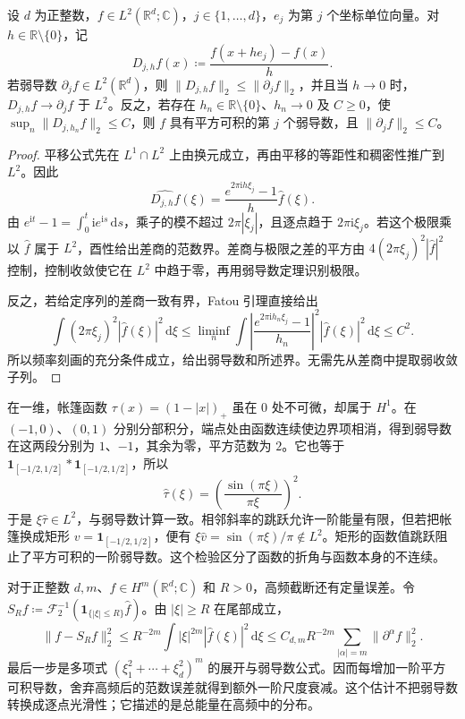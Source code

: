 \begin{proposition}[平方范数差商]\label{b2:prop:04-difference-quotients}
设 \(d\) 为正整数，\(f\in L^2(\mathbb R^d;\mathbb C)\)，\(j\in\{1,\ldots,d\}\)，\(e_j\) 为第 \(j\) 个坐标单位向量。对 \(h\in\mathbb R\setminus\{0\}\)，记
\[
 D_{j,h}f(x)\coloneqq\frac{f(x+he_j)-f(x)}h.
\]
若弱导数 \(\partial_jf\in L^2(\mathbb R^d)\)，则 \(\|D_{j,h}f\|_2\leq\|\partial_jf\|_2\)，并且当 \(h\to0\) 时，\(D_{j,h}f\to\partial_jf\) 于 \(L^2\)。反之，若存在 \(h_n\in\mathbb R\setminus\{0\}\)、\(h_n\to0\) 及 \(C\geq0\)，使 \(\sup_n\|D_{j,h_n}f\|_2\leq C\)，则 \(f\) 具有平方可积的第 \(j\) 个弱导数，且 \(\|\partial_jf\|_2\leq C\)。
\end{proposition}
\begin{proof}
平移公式先在 \(L^1\cap L^2\) 上由换元成立，再由平移的等距性和稠密性推广到 \(L^2\)。因此
\[
 \widehat {D_{j,h}f}(\xi)
 =\frac{e^{2\pi\mathrm{i}h\xi_j}-1}{h}\widehat f(\xi).
\]
由 \(e^{\mathrm{i}t}-1=\int_0^t\mathrm{i}e^{\mathrm{i}s}\,\mathrm{d}s\)，乘子的模不超过 \(2\pi|\xi_j|\)，且逐点趋于 \(2\pi\mathrm{i}\xi_j\)。若这个极限乘以 \(\widehat f\) 属于 \(L^2\)，酉性给出差商的范数界。差商与极限之差的平方由 \(4(2\pi\xi_j)^2|\widehat f|^2\) 控制，控制收敛使它在 \(L^2\) 中趋于零，再用弱导数定理识别极限。

反之，若给定序列的差商一致有界，Fatou 引理直接给出
\[
 \int(2\pi\xi_j)^2|\widehat f(\xi)|^2\,\mathrm{d}\xi
 \leq\liminf_n\int\left|\frac{e^{2\pi\mathrm{i}h_n\xi_j}-1}{h_n}\right|^2
       |\widehat f(\xi)|^2\,\mathrm{d}\xi\leq C^2.
\]
所以频率刻画的充分条件成立，给出弱导数和所述界。无需先从差商中提取弱收敛子列。
\end{proof}

在一维，帐篷函数 \(\tau(x)=(1-|x|)_+\) 虽在 \(0\) 处不可微，却属于 \(H^1\)。在 \((-1,0)\)、\((0,1)\) 分别分部积分，端点处由函数连续使边界项相消，得到弱导数在这两段分别为 \(1\)、\(-1\)，其余为零，平方范数为 \(2\)。它也等于 \(\mathbf1_{[-1/2,1/2]}*\mathbf1_{[-1/2,1/2]}\)，所以
\[
 \widehat\tau(\xi)=\left(\frac{\sin(\pi\xi)}{\pi\xi}\right)^2.
\]
于是 \(\xi\widehat\tau\in L^2\)，与弱导数计算一致。相邻斜率的跳跃允许一阶能量有限，但若把帐篷换成矩形 \(v=\mathbf1_{[-1/2,1/2]}\)，便有 \(\xi\widehat v=\sin(\pi\xi)/\pi\notin L^2\)。矩形的函数值跳跃阻止了平方可积的一阶弱导数。这个检验区分了函数的折角与函数本身的不连续。

\ProseParagraphBreak

对于正整数 \(d,m\)、\(f\in H^m(\mathbb R^d;\mathbb C)\) 和 \(R>0\)，高频截断还有定量误差。令 \(S_Rf\coloneqq\mathcal F_2^{-1}(\mathbf1_{\{|\xi|\leq R\}}\widehat f)\)。由 \(|\xi|\geq R\) 在尾部成立，
\[
 \|f-S_Rf\|_2^2
 \leq R^{-2m}\int|\xi|^{2m}|\widehat f(\xi)|^2\,\mathrm{d}\xi
 \leq C_{d,m}R^{-2m}\sum_{|\alpha|=m}\|\partial^\alpha f\|_2^2.
\]
最后一步是多项式 \((\xi_1^2+\cdots+\xi_d^2)^m\) 的展开与弱导数公式。因而每增加一阶平方可积导数，舍弃高频后的范数误差就得到额外一阶尺度衰减。这个估计不把弱导数转换成逐点光滑性；它描述的是总能量在高频中的分布。
